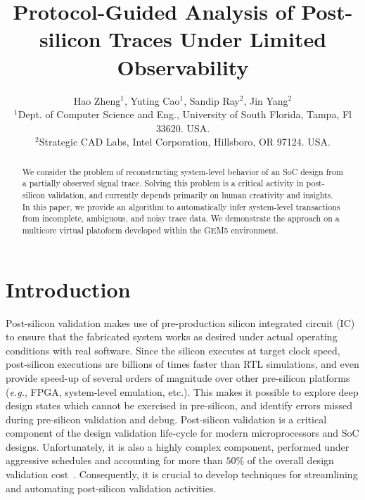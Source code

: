 \documentclass[conference]{IEEEtran}
\title{\Large {\bf Protocol-Guided Analysis of Post-silicon
  Traces Under Limited Observability}}
\author{\large Hao Zheng$^1$, Yuting Cao$^1$, Sandip Ray$^2$, Jin Yang$^2$ \\
 $^1$Dept. of Computer Science and Eng., University of South Florida, Tampa, Fl 33620. USA. \\
 $^2$Strategic CAD Labs, Intel Corporation, Hillsboro, OR 97124.  USA.}
\newcommand{\eg}{\mbox{{\em e.g.}}}
\begin{document}
\maketitle

\begin{abstract}
We consider the problem of reconstructing system-level
behavior of an SoC design from a partially observed signal
trace.  Solving this problem is a critical activity in
post-silicon validation, and currently depends primarily on
human creativity and insights.  In this paper, we provide an
algorithm to automatically infer system-level transactions
from incomplete, ambiguous, and noisy trace data.  We
demonstrate the approach on a multicore virtual platoform
developed within the GEM5 environment.
\end{abstract}

\section{Introduction}

Post-silicon validation makes use of pre-production silicon
integrated circuit (IC) to ensure that the fabricated system
works as desired under actual operating conditions with real
software.  Since the silicon executes at target clock speed,
post-silicon executions are billions of times faster than
RTL simulations, and even provide speed-up of several orders
of magnitude over other pre-silicon platforms (\eg, FPGA,
system-level emulation, etc.).  This makes it possible to
explore deep design states which cannot be exercised in
pre-silicon, and identify errors missed during pre-silicon
validation and debug.  Post-silicon validation is a critical
component of the design validation life-cycle for modern
microprocessors and SoC designs.  Unfortunately, it is also
a highly complex component, performed under aggressive
schedules and accounting for more than $50\%$ of the overall
design validation cost~\cite{Patra2007}.  Consequently, it is crucial to
develop techniques for streamlining and automating
post-silicon validation activities.
\end{document}
